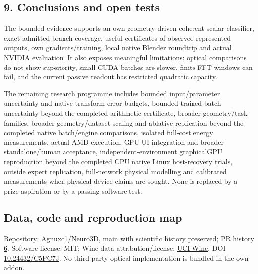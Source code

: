 \documentclass[
  10pt,
]{article}
\begin{document}
\hypertarget{conclusions-and-open-tests}{%
\subsection{9. Conclusions and open
tests}\label{conclusions-and-open-tests}}

The bounded evidence supports an own geometry-driven coherent scalar
classifier, exact admitted branch coverage, useful certificates of
observed represented outputs, own gradients/training, local native
Blender roundtrip and actual NVIDIA evaluation. It also exposes
meaningful limitations: optical comparisons do not show superiority,
small CUDA batches are slower, finite FFT windows can fail, and the
current passive readout has restricted quadratic capacity.

The remaining research programme includes bounded input/parameter
uncertainty and native-transform error budgets, bounded trained-batch
uncertainty beyond the completed arithmetic certificate, broader
geometry/task families, broader geometry/dataset scaling and ablative
replication beyond the completed native batch/engine comparisons,
isolated full-cost energy measurements, actual AMD execution, GPU UI
integration and broader standalone/human acceptance,
independent-environment graphicalGPU reproduction beyond the completed
CPU native Linux host-recovery trials, outside expert replication,
full-network physical modelling and calibrated measurements when
physical-device claims are sought. None is replaced by a prize
aspiration or by a passing software test.

\hypertarget{data-code-and-reproduction-map}{%
\subsection{Data, code and reproduction
map}\label{data-code-and-reproduction-map}}

Repository: \href{https://github.com/Agnuxo1/Neuro3D}{Agnuxo1/Neuro3D},
main with scientific history preserved;
\href{https://github.com/Agnuxo1/Neuro3D/pull/6}{PR history 6}. Software
license: MIT; Wine data attribution/license:
\href{https://archive.ics.uci.edu/dataset/109/wine}{UCI Wine}, DOI
\href{https://doi.org/10.24432/C5PC7J}{10.24432/C5PC7J}. No third-party
optical implementation is bundled in the own addon.
\end{document}
